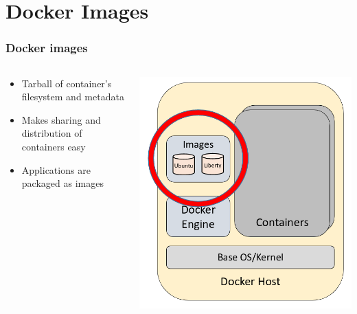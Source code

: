 \documentclass[aspectratio=169,11pt,hyperref={colorlinks=true}]{beamer}
\begin{document}
\section{Docker Images}
\begin{frame}
    \frametitle{Docker images}
    \begin{columns}[T]
        \begin{column}{.48\textwidth}
            \begin{itemize}
                \item Tarball of container's filesystem and metadata
                \item Makes sharing and distribution of containers easy
                \item Applications are packaged as images
            \end{itemize}
        \end{column}
        \begin{column}{.48\textwidth}
            \centering
            \includegraphics[width=.9\textwidth]{docker_images.png}
        \end{column}
    \end{columns}
\end{frame}
\end{document}
